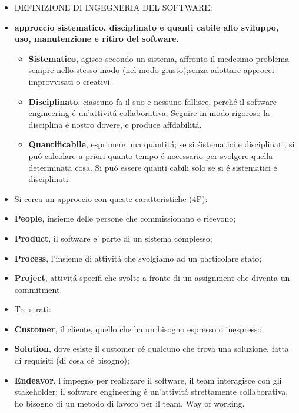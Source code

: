 \documentclass[10pt]{article}
\begin{document}
\begin{itemize}
\item DEFINIZIONE DI INGEGNERIA DEL SOFTWARE:

\item \textbf{approccio sistematico, disciplinato e quanti cabile allo sviluppo,
uso, manutenzione e ritiro del software.}
	\begin{itemize}
\item \textbf{Sistematico}, agisco secondo un sistema, affronto il medesimo
problema sempre nello stesso modo (nel modo
		giusto);senza adottare approcci improvvisati o creativi.

\item \textbf{Disciplinato}, ciascuno fa il suo e nessuno fallisce, perch\'e il
software engineering \'e un'attivit\'a collaborativa. Seguire in modo
		rigoroso la disciplina \'e nostro dovere, e  produce affdabilit\'a.

\item \textbf{Quantificabile}, esprimere una quantit\'a; se si \' sistematici e
disciplinati, si pu\'o calcolare a priori quanto tempo \'e necessario per
svolgere quella determinata cosa. Si pu\'o essere quanti cabili solo se si \'e
sistematici e disciplinati.
	\end{itemize}

\item Si cerca un approccio con queste caratteristiche (4P):

\item  \textbf{People}, insieme delle persone che commissionano e ricevono;
\item \textbf{Product}, il software e' parte di un sistema complesso;
\item \textbf{Process}, l'insieme di attivit\'a che svolgiamo ad un particolare
stato;
\item \textbf{Project}, attivit\'a specifi che svolte a fronte di un assignment
che diventa un commitment.

\item Tre strati:

\item \textbf{Customer}, il cliente, quello che ha un bisogno espresso o
inespresso;
\item \textbf{Solution}, dove esiste il customer c\'e qualcuno che trova una
soluzione, fatta di requisiti (di cosa c\'e
bisogno);
\item \textbf{Endeavor}, l'impegno per realizzare il software, il team interagisce
con gli stakeholder; il software engineering \'e un'attivit\'a
strettamente collaborativa, ho bisogno di un metodo di lavoro per il team. Way of
working.


\end{itemize}
\end{document}
